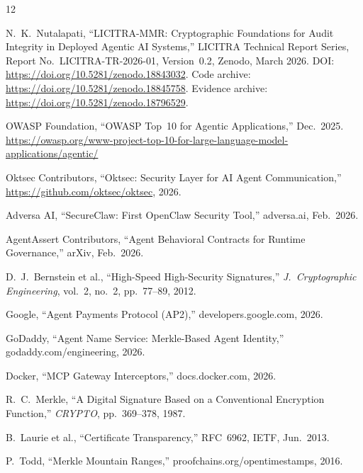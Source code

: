 \documentclass[11pt,a4paper]{article}
\begin{document}
\begin{thebibliography}{12}

N.~K.~Nutalapati,
``LICITRA-MMR: Cryptographic Foundations for Audit Integrity in Deployed Agentic AI Systems,''
LICITRA Technical Report Series, Report No.\ LICITRA-TR-2026-01, Version~0.2,
Zenodo, March 2026.
DOI: \url{https://doi.org/10.5281/zenodo.18843032}.
Code archive: \url{https://doi.org/10.5281/zenodo.18845758}.
Evidence archive: \url{https://doi.org/10.5281/zenodo.18796529}.

OWASP Foundation,
``OWASP Top~10 for Agentic Applications,'' Dec.\ 2025.
\url{https://owasp.org/www-project-top-10-for-large-language-model-applications/agentic/}

Oktsec Contributors,
``Oktsec: Security Layer for AI Agent Communication,''
\url{https://github.com/oktsec/oktsec}, 2026.

Adversa AI,
``SecureClaw: First OpenClaw Security Tool,''
adversa.ai, Feb.\ 2026.

AgentAssert Contributors,
``Agent Behavioral Contracts for Runtime Governance,''
arXiv, Feb.\ 2026.

D.~J.~Bernstein et al.,
``High-Speed High-Security Signatures,''
\emph{J.\ Cryptographic Engineering}, vol.~2, no.~2, pp.~77--89, 2012.

Google,
``Agent Payments Protocol (AP2),''
developers.google.com, 2026.

GoDaddy,
``Agent Name Service: Merkle-Based Agent Identity,''
godaddy.com/engineering, 2026.

Docker,
``MCP Gateway Interceptors,''
docs.docker.com, 2026.

R.~C.~Merkle,
``A Digital Signature Based on a Conventional Encryption Function,''
\emph{CRYPTO}, pp.~369--378, 1987.

B.~Laurie et al.,
``Certificate Transparency,''
RFC~6962, IETF, Jun.\ 2013.

P.~Todd,
``Merkle Mountain Ranges,''
proofchains.org/opentimestamps, 2016.

\end{thebibliography}
\end{document}
